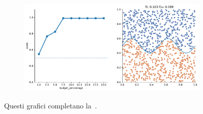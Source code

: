 \begin{appendices}
\begin{figure}
\begin{subfigure}{.5\textwidth}
    \end{subfigure}%
    \hfill
    \begin{subfigure}{.5\textwidth}
        \centering
        \includegraphics[width=\textwidth]{img/2d_v2/11.pdf}
    \end{subfigure}
\caption{Questi grafici completano la~.}
\end{figure}


\end{appendices}
